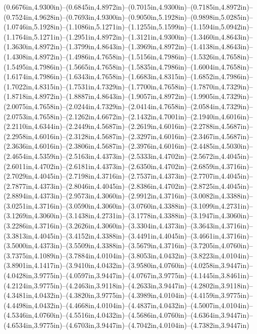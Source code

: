 (0.6676in,4.9300in)--(0.6845in,4.8972in)--(0.7015in,4.9300in)--(0.7185in,4.8972in)--(0.7524in,4.9628in)--(0.7693in,4.9300in)--(0.9050in,5.1928in)--(0.9898in,5.0285in)--(1.0746in,5.1928in)--(1.1086in,5.1271in)--(1.1255in,5.1599in)--(1.1594in,5.0942in)--(1.1764in,5.1271in)--(1.2951in,4.8972in)--(1.3121in,4.9300in)--(1.3460in,4.8643in)--(1.3630in,4.8972in)--(1.3799in,4.8643in)--(1.3969in,4.8972in)--(1.4138in,4.8643in)--(1.4308in,4.8972in)--(1.4986in,4.7658in)--(1.5156in,4.7986in)--(1.5326in,4.7658in)--(1.5495in,4.7986in)--(1.5665in,4.7658in)--(1.5835in,4.7986in)--(1.6004in,4.7658in)--(1.6174in,4.7986in)--(1.6343in,4.7658in)--(1.6683in,4.8315in)--(1.6852in,4.7986in)--(1.7022in,4.8315in)--(1.7531in,4.7329in)--(1.7700in,4.7658in)--(1.7870in,4.7329in)--(1.8718in,4.8972in)--(1.8887in,4.8643in)--(1.9057in,4.8972in)--(1.9905in,4.7329in)--(2.0075in,4.7658in)--(2.0244in,4.7329in)--(2.0414in,4.7658in)--(2.0584in,4.7329in)--(2.0753in,4.7658in)--(2.1262in,4.6672in)--(2.1432in,4.7001in)--(2.1940in,4.6016in)--(2.2110in,4.6344in)--(2.2449in,4.5687in)--(2.2619in,4.6016in)--(2.2788in,4.5687in)--(2.2958in,4.6016in)--(2.3128in,4.5687in)--(2.3297in,4.6016in)--(2.3467in,4.5687in)--(2.3636in,4.6016in)--(2.3806in,4.5687in)--(2.3976in,4.6016in)--(2.4485in,4.5030in)--(2.4654in,4.5359in)--(2.5163in,4.4373in)--(2.5333in,4.4702in)--(2.5672in,4.4045in)--(2.6011in,4.4702in)--(2.6181in,4.4373in)--(2.6350in,4.4702in)--(2.6859in,4.3716in)--(2.7029in,4.4045in)--(2.7198in,4.3716in)--(2.7537in,4.4373in)--(2.7707in,4.4045in)--(2.7877in,4.4373in)--(2.8046in,4.4045in)--(2.8386in,4.4702in)--(2.8725in,4.4045in)--(2.8894in,4.4373in)--(2.9573in,4.3060in)--(2.9912in,4.3716in)--(3.0082in,4.3388in)--(3.0251in,4.3716in)--(3.0590in,4.3060in)--(3.0760in,4.3388in)--(3.1099in,4.2731in)--(3.1269in,4.3060in)--(3.1438in,4.2731in)--(3.1778in,4.3388in)--(3.1947in,4.3060in)--(3.2286in,4.3716in)--(3.2626in,4.3060in)--(3.3304in,4.4373in)--(3.3643in,4.3716in)--(3.3813in,4.4045in)--(3.4152in,4.3388in)--(3.4491in,4.4045in)--(3.4661in,4.3716in)--(3.5000in,4.4373in)--(3.5509in,4.3388in)--(3.5679in,4.3716in)--(3.7205in,4.0760in)--(3.7375in,4.1089in)--(3.7884in,4.0104in)--(3.8053in,4.0432in)--(3.8223in,4.0104in)--(3.8901in,4.1417in)--(3.9410in,4.0432in)--(3.9580in,4.0760in)--(4.0258in,3.9447in)--(4.0428in,3.9775in)--(4.0597in,3.9447in)--(4.0767in,3.9775in)--(4.1445in,3.8461in)--(4.2124in,3.9775in)--(4.2463in,3.9118in)--(4.2633in,3.9447in)--(4.2802in,3.9118in)--(4.3481in,4.0432in)--(4.3820in,3.9775in)--(4.3989in,4.0104in)--(4.4159in,3.9775in)--(4.4498in,4.0432in)--(4.4668in,4.0104in)--(4.4837in,4.0432in)--(4.5007in,4.0104in)--(4.5346in,4.0760in)--(4.5516in,4.0432in)--(4.5686in,4.0760in)--(4.6364in,3.9447in)--(4.6534in,3.9775in)--(4.6703in,3.9447in)--(4.7042in,4.0104in)--(4.7382in,3.9447in) 